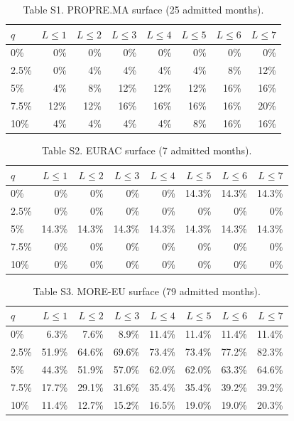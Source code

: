 \documentclass[11pt]{article}
\begin{document}
\begin{table}[h]
\centering
\caption*{Table S1. PROPRE.MA surface (25 admitted months).}
\begin{tabular}{lrrrrrrr}
\toprule
$q$ & $L\le1$ & $L\le2$ & $L\le3$ & $L\le4$ & $L\le5$ & $L\le6$ & $L\le7$ \\
\midrule
0\% & 0\% & 0\% & 0\% & 0\% & 0\% & 0\% & 0\% \\
2.5\% & 0\% & 4\% & 4\% & 4\% & 4\% & 8\% & 12\% \\
5\% & 4\% & 8\% & 12\% & 12\% & 12\% & 16\% & 16\% \\
7.5\% & 12\% & 12\% & 16\% & 16\% & 16\% & 16\% & 20\% \\
10\% & 4\% & 4\% & 4\% & 4\% & 8\% & 16\% & 16\% \\
\bottomrule
\end{tabular}
\end{table}

\begin{table}[h]
\centering
\caption*{Table S2. EURAC surface (7 admitted months).}
\begin{tabular}{lrrrrrrr}
\toprule
$q$ & $L\le1$ & $L\le2$ & $L\le3$ & $L\le4$ & $L\le5$ & $L\le6$ & $L\le7$ \\
\midrule
0\% & 0\% & 0\% & 0\% & 0\% & 14.3\% & 14.3\% & 14.3\% \\
2.5\% & 0\% & 0\% & 0\% & 0\% & 0\% & 0\% & 0\% \\
5\% & 14.3\% & 14.3\% & 14.3\% & 14.3\% & 14.3\% & 14.3\% & 14.3\% \\
7.5\% & 0\% & 0\% & 0\% & 0\% & 0\% & 0\% & 0\% \\
10\% & 0\% & 0\% & 0\% & 0\% & 0\% & 0\% & 0\% \\
\bottomrule
\end{tabular}
\end{table}

\begin{table}[h]
\centering
\caption*{Table S3. MORE-EU surface (79 admitted months).}
\begin{tabular}{lrrrrrrr}
\toprule
$q$ & $L\le1$ & $L\le2$ & $L\le3$ & $L\le4$ & $L\le5$ & $L\le6$ & $L\le7$ \\
\midrule
0\% & 6.3\% & 7.6\% & 8.9\% & 11.4\% & 11.4\% & 11.4\% & 11.4\% \\
2.5\% & 51.9\% & 64.6\% & 69.6\% & 73.4\% & 73.4\% & 77.2\% & 82.3\% \\
5\% & 44.3\% & 51.9\% & 57.0\% & 62.0\% & 62.0\% & 63.3\% & 64.6\% \\
7.5\% & 17.7\% & 29.1\% & 31.6\% & 35.4\% & 35.4\% & 39.2\% & 39.2\% \\
10\% & 11.4\% & 12.7\% & 15.2\% & 16.5\% & 19.0\% & 19.0\% & 20.3\% \\
\bottomrule
\end{tabular}
\end{table}
\end{document}
